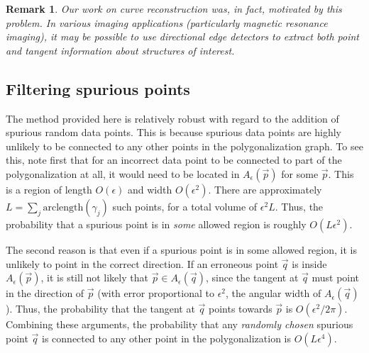 \documentclass{article}
\newtheorem{varremark}[cntr]{Remark}
\newenvironment{remark}{\begin{varremark}\em}{\em\end{varremark}}
\numberwithin{cntr}{section}
\numberwithin{equation}{section}
\newcommand{\vp}[0]{{\vec{p}}}
\newcommand{\vq}[0]{{\vec{q}}}
\newcommand{\allowed}[2]{ { A_{#1}(#2) } }
\begin{document}
\begin{remark}
Our work on curve reconstruction was, in fact, motivated by this
problem. In various imaging applications (particularly magnetic
resonance imaging), it may be possible to use directional edge
detectors to extract both point and tangent information about
structures of interest.
\end{remark}

\subsection{Filtering spurious points}

The method provided here is relatively robust with regard to the
addition of spurious random data points. This is because spurious data
points are highly unlikely to be connected to any other points in the
polygonalization graph. To see this, note
first that for an incorrect data point to be connected to part of the
polygonalization at all, it would need to be located in
$\allowed{\epsilon}{\vp}$ for some $\vp$.
This is a region of length $O(\epsilon)$ and width $O(\epsilon^{2})$.
There are approximately $L = \sum_{j} \textrm{arclength}(\gamma_{j})$
such points, for a total volume of $\epsilon^{2} L$. Thus, the probability
that a spurious point is in \emph{some} allowed region is roughly
$O(L \epsilon^{2})$.

The second reason is that even if a spurious point is in some allowed region,
it is unlikely to point in the correct direction.
If an erroneous point $\vq$ is inside $\allowed{\epsilon}{\vp}$, it is
still not likely that $\vp \in \allowed{\epsilon}{\vq}$, since
the tangent at $\vq$ must point in the direction of $\vp$
(with error proportional to $\epsilon^{2}$, the angular width of
$\allowed{\epsilon}{\vq}$). Thus, the probability that the tangent at
$\vq$ points towards $\vp$ is $O(\epsilon^{2}/2\pi)$.
Combining these arguments, the probability that any \emph{randomly chosen}
spurious point $\vq$ is connected to any other point in the
polygonalization is $O(L \epsilon^{4})$.
\end{document}
